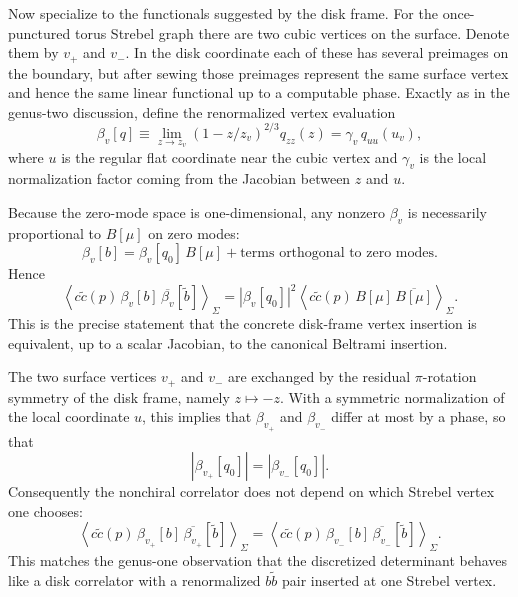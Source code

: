 \documentclass[12pt]{article}
\newcommand{\wt}[1]{\widetilde{#1}}
\newcommand{\ol}[1]{\overline{#1}}
\begin{document}
Now specialize to the functionals suggested by the disk frame. For the once-punctured torus Strebel graph there are two cubic vertices on the surface. Denote them by $v_+$ and $v_-$. In the disk coordinate each of these has several preimages on the boundary, but after sewing those preimages represent the same surface vertex and hence the same linear functional up to a computable phase. Exactly as in the genus-two discussion, define the renormalized vertex evaluation
\begin{equation}
\beta_v[q] \equiv \lim_{z\to z_v}(1-z/z_v)^{2/3}q_{zz}(z)
= \gamma_v\,q_{uu}(u_v),
\end{equation}
where $u$ is the regular flat coordinate near the cubic vertex and $\gamma_v$ is the local normalization factor coming from the Jacobian between $z$ and $u$.

Because the zero-mode space is one-dimensional, any nonzero $\beta_v$ is necessarily proportional to $B[\mu]$ on zero modes:
\begin{equation}
\beta_v[b] = \beta_v[q_0]\, B[\mu] + \text{terms orthogonal to zero modes}.
\end{equation}
Hence
\begin{equation}
\left\langle c\wt{c}(p)\,\beta_v[b]\,\ol{\beta_v}[\wt{b}]\right\rangle_{\Sigma}
= |\beta_v[q_0]|^2
\left\langle c\wt{c}(p)\,B[\mu]\,\ol{B[\mu]}\right\rangle_{\Sigma}.
\label{eq:genusonevertex}
\end{equation}
This is the precise statement that the concrete disk-frame vertex insertion is equivalent, up to a scalar Jacobian, to the canonical Beltrami insertion.

The two surface vertices $v_+$ and $v_-$ are exchanged by the residual $\pi$-rotation symmetry of the disk frame, namely $z\mapsto -z$. With a symmetric normalization of the local coordinate $u$, this implies that $\beta_{v_+}$ and $\beta_{v_-}$ differ at most by a phase, so that
\begin{equation}
|\beta_{v_+}[q_0]| = |\beta_{v_-}[q_0]|.
\end{equation}
Consequently the nonchiral correlator does not depend on which Strebel vertex one chooses:
\begin{equation}
\left\langle c\wt{c}(p)\,\beta_{v_+}[b]\,\ol{\beta_{v_+}}[\wt{b}]\right\rangle_{\Sigma}
=
\left\langle c\wt{c}(p)\,\beta_{v_-}[b]\,\ol{\beta_{v_-}}[\wt{b}]\right\rangle_{\Sigma}.
\end{equation}
This matches the genus-one observation that the discretized determinant behaves like a disk correlator with a renormalized $b\wt{b}$ pair inserted at one Strebel vertex.
\end{document}
